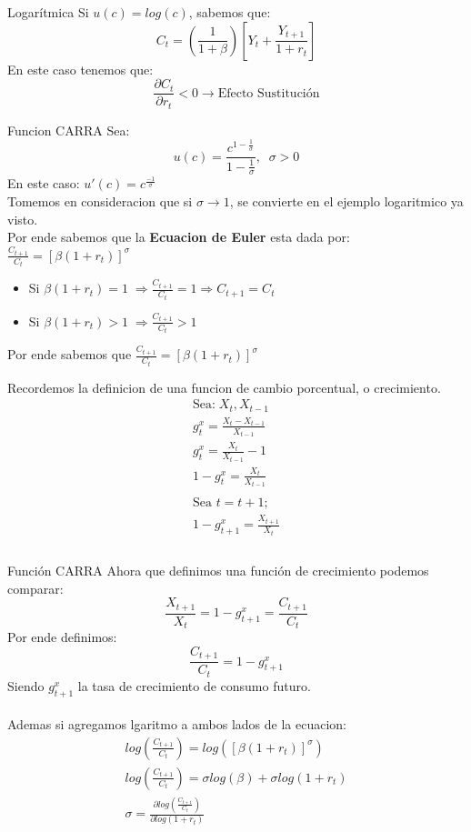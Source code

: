 \documentclass[12pt]{article}
\begin{document}
\begin{ejemplo}{Logarítmica}
    Si $u(c)=log(c)$, sabemos que: 
    $$C_t=(\frac{1}{1+\beta})[Y_t+\frac{Y_{t+1}}{1+r_t}]$$
    En este caso tenemos que:
    $$\frac{\partial C_t}{\partial r_t}<0 \xrightarrow{} \text{Efecto Sustitución}$$
\end{ejemplo}
\newpage
\begin{ejemplo}{Funcion CARRA}
    Sea: $$u(c)=\frac{c^{1-\frac{1}{\sigma}}}{1-\frac{1}{\sigma}},\;\; \sigma>0$$
    En este caso: $u'(c)=c^{\frac{-1}{\sigma}}$\\
    Tomemos en consideracion que si $\sigma\xrightarrow{}1$, se convierte en el ejemplo logaritmico ya visto.\\
    Por ende sabemos que la \textbf{Ecuacion de Euler} esta dada por: \\
    $\frac{C_{t+1}}{C_t}=[\beta(1+r_t)]^\sigma$\\
    \begin{itemize}
        \item Si $\beta(1+r_t)=1\; \Rightarrow{} \frac{C_{t+1}}{C_t}=1 \Rightarrow{} C_{t+1}=C_t$
        \item Si $\beta(1+r_t)>1\; \Rightarrow{} \frac{C_{t+1}}{C_t}>1$
    \end{itemize}
    Por ende sabemos que $\frac{C_{t+1}}{C_t}=[\beta(1+r_t)]^\sigma$\\
\end{ejemplo}
Recordemos la definicion de una funcion de cambio porcentual, o crecimiento. 
\begin{align*}
    \text{Sea:}\; X_t,X_{t-1} \\
    g_t^x= \frac{X_t-X_{t-1}}{X_{t-1}} \\ 
    g_t^x= \frac{X_t}{X_{t-1}}-1 \\
    1-g_t^x=\frac{X_t}{X_{t-1}}\\\\
    \text{Sea $t=t+1$};\\
    1-g_{t+1}^x=\frac{X_{t+1}}{X_{t}}\\\\
\end{align*}
\begin{ejemplo}{Función CARRA}
    Ahora que definimos una función de crecimiento podemos comparar:
       $$ \frac{X_{t+1}}{X_{t}}=1-g_{t+1}^x=\frac{C_{t+1}}{C_t}$$
    Por ende definimos:
    $$\frac{C_{t+1}}{C_t}=1-g_{t+1}^x$$
    Siendo $g_{t+1}^x$ la tasa de crecimiento de consumo futuro. \\\\
    Ademas si agregamos lgaritmo a ambos lados de la ecuacion:\\
    \begin{align*}
        log(\frac{C_{t+1}}{C_t})=log([\beta(1+r_t)]^\sigma)\\
        log(\frac{C_{t+1}}{C_t})=\sigma log(\beta)+\sigma log(1+r_t)\\
        \sigma=\frac{\partial log(\frac{C_{t+1}}{C_t})}{\partial log(1+r_t)}
    \end{align*}
\end{ejemplo}
\end{document}
